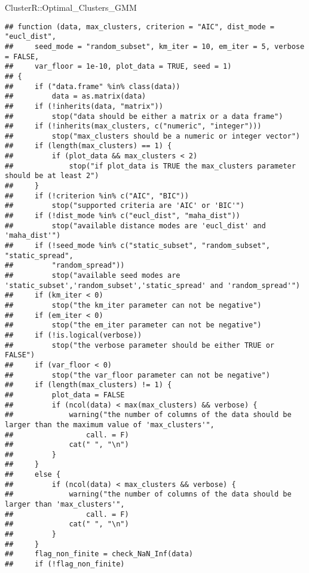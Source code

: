\documentclass[
]{article}
\newenvironment{Shaded}{\begin{snugshade}}{\end{snugshade}}
\newcommand{\NormalTok}[1]{#1}
\newcommand{\SpecialCharTok}[1]{\textcolor[rgb]{0.00,0.00,0.00}{#1}}
\begin{document}
\begin{Shaded}
\begin{Highlighting}[]
\NormalTok{ClusterR}\SpecialCharTok{::}\NormalTok{Optimal\_Clusters\_GMM}
\end{Highlighting}
\end{Shaded}

\begin{verbatim}
## function (data, max_clusters, criterion = "AIC", dist_mode = "eucl_dist", 
##     seed_mode = "random_subset", km_iter = 10, em_iter = 5, verbose = FALSE, 
##     var_floor = 1e-10, plot_data = TRUE, seed = 1) 
## {
##     if ("data.frame" %in% class(data)) 
##         data = as.matrix(data)
##     if (!inherits(data, "matrix")) 
##         stop("data should be either a matrix or a data frame")
##     if (!inherits(max_clusters, c("numeric", "integer"))) 
##         stop("max_clusters should be a numeric or integer vector")
##     if (length(max_clusters) == 1) {
##         if (plot_data && max_clusters < 2) 
##             stop("if plot_data is TRUE the max_clusters parameter should be at least 2")
##     }
##     if (!criterion %in% c("AIC", "BIC")) 
##         stop("supported criteria are 'AIC' or 'BIC'")
##     if (!dist_mode %in% c("eucl_dist", "maha_dist")) 
##         stop("available distance modes are 'eucl_dist' and 'maha_dist'")
##     if (!seed_mode %in% c("static_subset", "random_subset", "static_spread", 
##         "random_spread")) 
##         stop("available seed modes are 'static_subset','random_subset','static_spread' and 'random_spread'")
##     if (km_iter < 0) 
##         stop("the km_iter parameter can not be negative")
##     if (em_iter < 0) 
##         stop("the em_iter parameter can not be negative")
##     if (!is.logical(verbose)) 
##         stop("the verbose parameter should be either TRUE or FALSE")
##     if (var_floor < 0) 
##         stop("the var_floor parameter can not be negative")
##     if (length(max_clusters) != 1) {
##         plot_data = FALSE
##         if (ncol(data) < max(max_clusters) && verbose) {
##             warning("the number of columns of the data should be larger than the maximum value of 'max_clusters'", 
##                 call. = F)
##             cat(" ", "\n")
##         }
##     }
##     else {
##         if (ncol(data) < max_clusters && verbose) {
##             warning("the number of columns of the data should be larger than 'max_clusters'", 
##                 call. = F)
##             cat(" ", "\n")
##         }
##     }
##     flag_non_finite = check_NaN_Inf(data)
##     if (!flag_non_finite) 

\end{verbatim}
\end{document}
